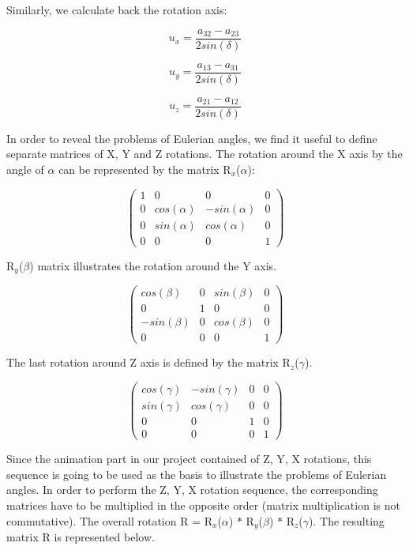 \documentclass[times, 10pt,twocolumn]{article}
\begin{document}
Similarly, we calculate back the rotation axis:

\begin{equation}
\label{eq_three1}
u_{x} = \frac{a_{32} - a_{23}}{2sin(\delta)}
\end{equation}

\begin{equation}
\label{eq_three2}
u_{y} = \frac{a_{13} - a_{31}}{2sin(\delta)}
\end{equation}

\begin{equation}
\label{eq_three3}
u_{z} = \frac{a_{21} - a_{12}}{2sin(\delta)}
\end{equation}

In order to reveal the problems of Eulerian angles, we find it useful to define separate matrices of X, Y and Z rotations.
The rotation around the X axis by the angle of $\alpha$ can be represented by the matrix R$_{x}$($\alpha$):

\[ \left( \begin{array}{cccc}
1 & 0 & 0 & 0 \\
0 & cos(\alpha) & -sin(\alpha) & 0 \\
0 & sin(\alpha) & cos(\alpha) & 0 \\
0 & 0 & 0 & 1
\end{array} \right)\]

R$_{y}$($\beta$) matrix illustrates the rotation around the Y axis.

\[ \left( \begin{array}{cccc}
cos(\beta) & 0 & sin(\beta) & 0 \\
0 & 1 & 0 & 0 \\
-sin(\beta) & 0 & cos(\beta) & 0 \\
0 & 0 & 0 & 1
\end{array} \right)\]

The last rotation around Z axis is defined by the matrix R$_{z}$($\gamma$).

\[ \left( \begin{array}{cccc}
cos(\gamma) & -sin(\gamma) & 0 & 0 \\
sin(\gamma) & cos(\gamma) & 0 & 0 \\
0 & 0 & 1 & 0 \\
0 & 0 & 0 & 1
\end{array} \right)\]

Since the animation part in our project contained of Z, Y, X rotations, this sequence is going to be used as the basis to illustrate the problems of Eulerian angles. In order to perform the Z, Y, X rotation sequence, the corresponding matrices have to be multiplied in the opposite order (matrix multiplication is not commutative). The overall rotation R = R$_{x}$($\alpha$) $\ast$ R$_{y}$($\beta$) $\ast$ R$_{z}$($\gamma$). The resulting matrix R is represented below.
\end{document}
